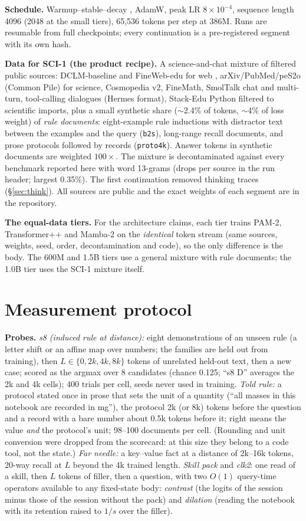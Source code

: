 \documentclass[11pt]{article}
\newcommand{\arch}{PAM-2}
\newcommand{\tpp}{Transformer++}
\newcommand{\mamba}{Mamba-2}
\newcommand{\scione}{SCI-1}
\begin{document}
\textbf{Schedule.} Warmup--stable--decay \citep{hagele2024wsd}, AdamW, peak LR $8\times10^{-4}$, sequence length 4096 (2048 at the small tiers), 65,536 tokens per step at 386M. Runs are resumable from full checkpoints; every continuation is a pre-registered segment with its own hash.

\textbf{Data for \scione{} (the product recipe).} A science-and-chat mixture of filtered public sources: DCLM-baseline and FineWeb-edu for web \citep{li2024dclm,penedo2024fineweb}, arXiv/PubMed/peS2o (Common Pile) for science, Cosmopedia v2, FineMath, SmolTalk chat and multi-turn, tool-calling dialogues (Hermes format), Stack-Edu Python filtered to scientific imports, plus a small synthetic share ($\sim$2.4\% of tokens, $\sim$4\% of loss weight) of \emph{rule documents}: eight-example rule inductions with distractor text between the examples and the query (\texttt{b2s}), long-range recall documents, and prose protocols followed by records (\texttt{proto4k}). Answer tokens in synthetic documents are weighted $100\times$. The mixture is decontaminated against every benchmark reported here with word 13-grams (drops per source in the run header; largest 0.35\%). The first continuation removed thinking traces (\S\ref{sec:think}). All sources are public and the exact weights of each segment are in the repository.

\textbf{The equal-data tiers.} For the architecture claims, each tier trains \arch, \tpp{} and \mamba{} on the \emph{identical} token stream (same sources, weights, seed, order, decontamination and code), so the only difference is the body. The 600M and 1.5B tiers use a general mixture with rule documents; the 1.0B tier uses the \scione{} mixture itself.

\section{Measurement protocol}
\label{sec:protocol}
\textbf{Probes.} \emph{s8 (induced rule at distance):} eight demonstrations of an unseen rule (a letter shift or an affine map over numbers; the families are held out from training), then $L\in\{0,2k,4k,8k\}$ tokens of unrelated held-out text, then a new case; scored as the argmax over 8 candidates (chance 0.125; ``s8 D'' averages the 2k and 4k cells); 400 trials per cell, seeds never used in training. \emph{Told rule:} a protocol stated once in prose that sets the unit of a quantity (``all masses in this notebook are recorded in mg''), the protocol 2k (or 8k) tokens before the question and a record with a bare number about 0.5k tokens before it; right means the value \emph{and} the protocol's unit; 98--100 documents per cell. (Rounding and unit conversion were dropped from the scorecard: at this size they belong to a code tool, not the state.) \emph{Far needle:} a key--value fact at a distance of 2k--16k tokens, 20-way recall at $L$ beyond the 4k trained length. \emph{Skill pack} and \emph{clk2}: one read of a skill, then $L$ tokens of filler, then a question, with two $O(1)$ query-time operators available to any fixed-state body: \emph{contrast} (the logits of the session minus those of the session without the pack) and \emph{dilation} (reading the notebook with its retention raised to $1/s$ over the filler).
\end{document}
